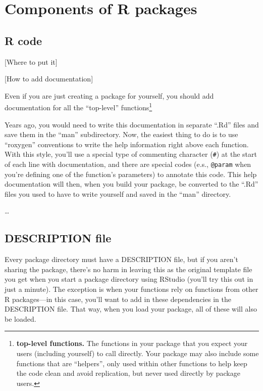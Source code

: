\documentclass[]{tufte-book}
\begin{document}
\hypertarget{components-of-r-packages}{%
\section{Components of R packages}\label{components-of-r-packages}}

\hypertarget{r-code}{%
\subsection{R code}\label{r-code}}

{[}Where to put it{]}

{[}How to add documentation{]}

Even if you are just creating a package for yourself, you should add documentation
for all the ``top-level'' functions\footnote{\textbf{top-level functions.} The functions in your package
  that you expect your users (including yourself) to call directly. Your package may also
  include some functions that are ``helpers'', only used within other functions to help
  keep the code clean and avoid replication, but never used directly by package users.}

Years ago, you would need to write this documentation in separate ``.Rd'' files and save them
in the ``man'' subdirectory. Now, the easiest thing to do is to use ``roxygen'' conventions
to write the help information right above each function. With this style, you'll use a
special type of commenting character (\texttt{\#\textquotesingle{}}) at the start of each line with documentation,
and there are special codes (e.s., \texttt{@param} when you're defining one of the function's
parameters) to annotate this code. This help documentation will then, when you build your
package, be converted to the ``.Rd'' files you used to have to write yourself and saved in
the ``man'' directory.

\ldots{}

\hypertarget{description-file}{%
\subsection{DESCRIPTION file}\label{description-file}}

Every package directory must have a DESCRIPTION file, but if you aren't sharing
the package, there's no harm in leaving this as the original template file you
get when you start a package directory using RStudio (you'll try this out in
just a minute). The exception is when your functions rely on functions from
other R packages---in this case, you'll want to add in these dependencies in the
DESCRIPTION file. That way, when you load your package, all of these will also
be loaded.
\end{document}
